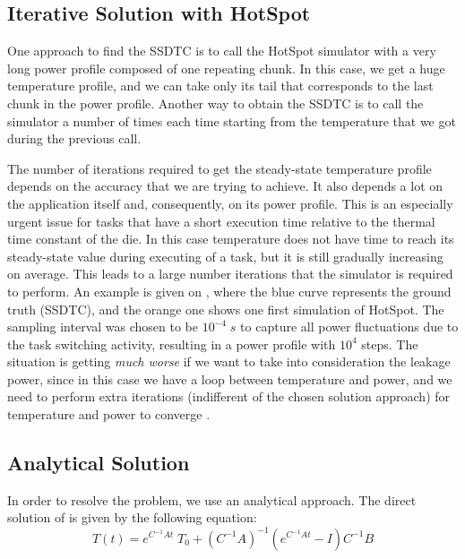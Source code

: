 \subsection{Iterative Solution with HotSpot}
One approach to find the SSDTC is to call the HotSpot simulator with a very long power profile composed of one repeating chunk. In this case, we get a huge temperature profile, and we can take only its tail that corresponds to the last chunk in the power profile. Another way to obtain the SSDTC is to call the simulator a number of times each time starting from the temperature that we got during the previous call.

The number of iterations required to get the steady-state temperature profile depends on the accuracy that we are trying to achieve. It also depends a lot on the application itself and, consequently, on its power profile. This is an especially urgent issue for tasks that have a short execution time relative to the thermal time constant of the die. In this case temperature does not have time to reach its steady-state value during executing of a task, but it is still gradually increasing on average. This leads to a large number iterations that the simulator is required to perform. An example is given on , where the blue curve represents the ground truth (SSDTC), and the orange one shows one first simulation of HotSpot. The sampling interval was chosen to be $10^{-4} \; s$ to capture all power fluctuations due to the task switching activity, resulting in a power profile with $10^4$ steps. The situation is getting \emph{much worse} if we want to take into consideration the leakage power, since in this case we have a loop between temperature and power, and we need to perform extra iterations (indifferent of the chosen solution approach) for temperature and power to converge \cite{liu2007}.

\subsection{Analytical Solution}
In order to resolve the problem, we use an analytical approach. The direct solution of  is given by the following equation:
\begin{equation} \label{eq:solution}
  T(t) = e^{C^{-1}A t} \; T_0 + (C^{-1} A)^{-1}(e^{C^{-1}A t} - I)C^{-1} B
\end{equation}

